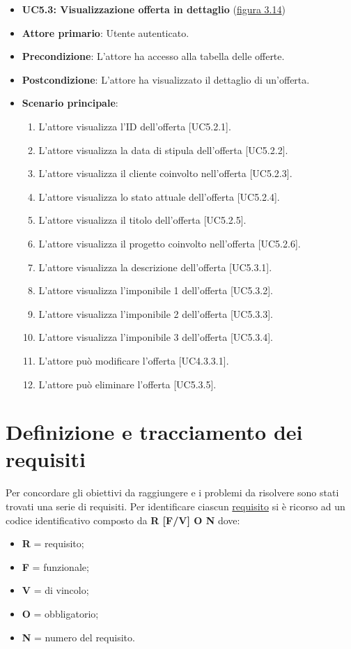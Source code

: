 \begin{itemize}
\item \textbf{UC5.3: Visualizzazione offerta in dettaglio} ({\hyperref[fig:UC5.3]{figura 3.14}})
\item \textbf{Attore primario}: Utente autenticato.
\item \textbf{Precondizione}: L'attore ha accesso alla tabella delle offerte.
\item \textbf{Postcondizione}: L'attore ha visualizzato il dettaglio di un'offerta.

\pagebreak
\item \textbf{Scenario principale}: 
\begin{enumerate}
\item L'attore visualizza l'ID dell'offerta [UC5.2.1].
\item L'attore visualizza la data di stipula dell'offerta [UC5.2.2].
\item L'attore visualizza il cliente coinvolto nell'offerta [UC5.2.3].
\item L'attore visualizza lo stato attuale dell'offerta [UC5.2.4].
\item L'attore visualizza il titolo dell'offerta [UC5.2.5].
\item L'attore visualizza il progetto coinvolto nell'offerta [UC5.2.6].
\item L'attore visualizza la descrizione dell'offerta [UC5.3.1].
\item L'attore visualizza l'imponibile 1 dell'offerta [UC5.3.2].
\item L'attore visualizza l'imponibile 2 dell'offerta [UC5.3.3].
\item L'attore visualizza l'imponibile 3 dell'offerta [UC5.3.4].
\item L'attore può modificare l'offerta [UC4.3.3.1].
\item L'attore può eliminare l'offerta [UC5.3.5].
\end{enumerate}
\end{itemize}

\section{Definizione e tracciamento dei requisiti}
Per concordare gli obiettivi da raggiungere e i problemi da risolvere sono stati trovati una serie di requisiti. 
Per identificare ciascun {\hyperref[para:requisito-definition]{requisito}}\glsfirstoccur \; si è ricorso ad un codice identificativo composto da \textbf{R [F/V] O N} dove:
\begin{itemize}
\item \textbf{R} = requisito;
\item \textbf{F} = funzionale;
\item \textbf{V} = di vincolo;
\item \textbf{O} = obbligatorio;
\item \textbf{N} = numero del requisito.
\end{itemize}

